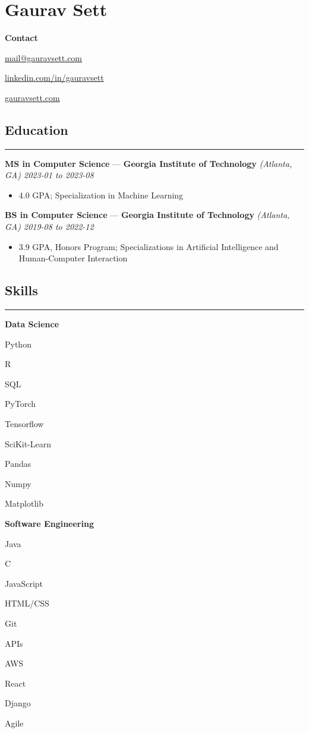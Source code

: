 \documentclass[10pt]{article}
\newcommand{\resumeHeading}[1]{
    \subsection*{#1}
    \hrule
    \vspace*{5pt}
}
\newcommand{\resumeSubHeading}[5]{
    \vspace*{5pt}
    \textbf{#1} — \textbf{#2} \textsl{(#3) \hfill #4 to #5}
}
\newcommand{\resumeListHeading}[1]{\vspace*{5pt}\textbf{#1}}
\begin{document}
\section*{Gaurav Sett}

\textbf{Contact}
\begin{itemize*}[label=$|$]
    \item \href{mailto:mail@gauravsett.com}{mail@gauravsett.com}
    \item \href{https://linkedin.com/in/gauravsett}{linkedin.com/in/gauravsett}
    \item \href{https://gauravsett.com}{gauravsett.com}
\end{itemize*}



\resumeHeading{Education}

\resumeSubHeading
    {MS in Computer Science}
    {Georgia Institute of Technology}
    {Atlanta, GA}
    {2023-01}
    {2023-08}
\begin{itemize}
    \item 4.0 GPA;\: 
        Specialization in Machine Learning
\end{itemize}

\resumeSubHeading
    {BS in Computer Science}
    {Georgia Institute of Technology}
    {Atlanta, GA}
    {2019-08}
    {2022-12}
\begin{itemize}
    \item 3.9 GPA, Honors Program;\: 
        Specializations in Artificial Intelligence and Human-Computer Interaction
\end{itemize}



\resumeHeading{Skills}

\resumeListHeading{Data Science}
\begin{itemize*}[label=$|$]
    \item Python
    \item R
    \item SQL
    \item PyTorch
    \item Tensorflow
    \item SciKit-Learn
    \item Pandas
    \item Numpy
    \item Matplotlib
\end{itemize*}

\resumeListHeading{Software Engineering}
\begin{itemize*}[label=$|$]
    \item Java
    \item C
    \item JavaScript 
    \item HTML/CSS 
    \item Git
    \item APIs
    \item AWS
    \item React
    \item Django
    \item Agile
\end{itemize*}
\end{document}
